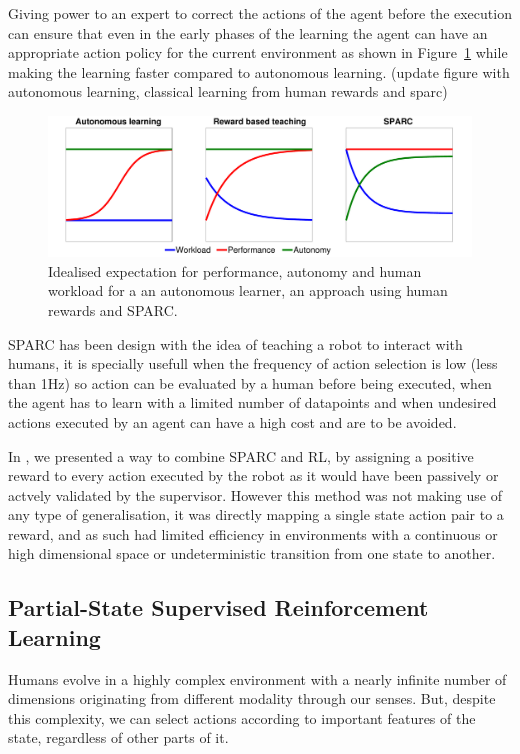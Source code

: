 \documentclass[letterpaper]{article} %
\begin{document}
Giving power to an expert to correct the actions of the agent before the
execution can ensure that even in the early phases of the learning the agent can
have an appropriate action policy for the current environment as shown in
Figure~\ref{fig:comparison} while making the learning faster compared to
autonomous learning. (update figure with autonomous learning, classical learning from human rewards
and sparc)

\begin{figure}
    \centering
    \includegraphics[width=0.9\linewidth]{./fig/motivation.pdf}
    \caption{Idealised expectation for performance, autonomy and human workload for a
    an autonomous learner, an approach using human rewards and SPARC.}
    \label{fig:comparison}
\end{figure}

SPARC has been design with the idea of teaching a robot to interact with humans,
it is specially usefull when the frequency of action selection is low (less than
1Hz) so action can be evaluated by a human before being executed, when the agent
has to learn with a limited number of datapoints and when
undesired actions executed by an agent can have a high cost and are to be
avoided. 

In \cite{senft2017supervised}, we presented a way to combine SPARC and RL, by
assigning a positive reward to every action executed by the robot as it would
have been passively or actvely validated by the supervisor. However this method
was not making use of any type of generalisation, it was directly mapping a
single state action pair to a reward, and as such had limited efficiency in
environments with a continuous or high dimensional space or undeterministic
transition from one state to another.

\subsection{Partial-State Supervised Reinforcement Learning}

Humans evolve in a highly complex environment with a nearly infinite number of
dimensions originating from different modality through our senses. But, despite
this complexity, we can select actions according to important features of the
state, regardless of other parts of it.
\end{document}
